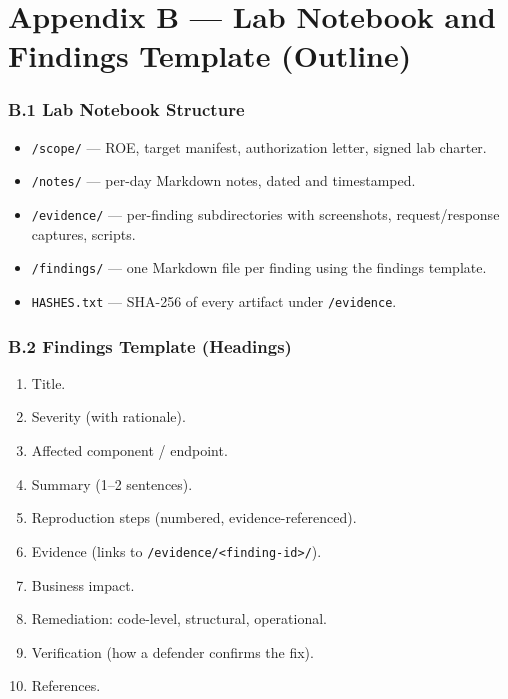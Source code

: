 \documentclass[11pt,letterpaper,oneside]{report}
\newcommand{\tool}[1]{\texttt{\small #1}}
\begin{document}
\chapter*{Appendix B --- Lab Notebook and Findings Template (Outline)}

\subsection*{B.1 Lab Notebook Structure}
\begin{itemize}
  \item \tool{/scope/} --- ROE, target manifest, authorization letter, signed lab charter.
  \item \tool{/notes/} --- per-day Markdown notes, dated and timestamped.
  \item \tool{/evidence/} --- per-finding subdirectories with screenshots, request/response captures, scripts.
  \item \tool{/findings/} --- one Markdown file per finding using the findings template.
  \item \tool{HASHES.txt} --- SHA-256 of every artifact under \tool{/evidence}.
\end{itemize}

\subsection*{B.2 Findings Template (Headings)}
\begin{enumerate}
  \item Title.
  \item Severity (with rationale).
  \item Affected component / endpoint.
  \item Summary (1--2 sentences).
  \item Reproduction steps (numbered, evidence-referenced).
  \item Evidence (links to \tool{/evidence/<finding-id>/}).
  \item Business impact.
  \item Remediation: code-level, structural, operational.
  \item Verification (how a defender confirms the fix).
  \item References.
\end{enumerate}

\end{document}
